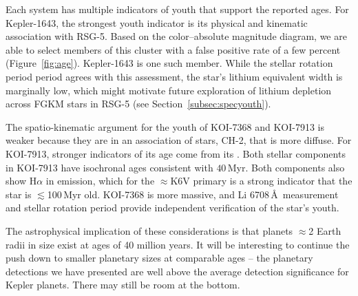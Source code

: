\documentclass[12pt,twocolumn,tighten,linenumbers,trackchanges]{aastex63}
\begin{document}
Each system has multiple indicators of youth that support the reported
ages.  For Kepler-1643, the strongest youth indicator is its physical
and kinematic association with RSG-5.  Based on the color--absolute
magnitude diagram, we are able to select members of this cluster with
a false positive rate of a few percent (Figure~\ref{fig:age}).
Kepler-1643 is one such member.  While the stellar rotation period
period agrees with this assessment, the star's lithium equivalent
width is marginally low, which might motivate future exploration of
lithium depletion across FGKM stars in RSG-5 (see
Section~\ref{subsec:specyouth}).

The spatio-kinematic argument for the youth of KOI-7368 and KOI-7913
is weaker because they are in an association of stars, CH-2, that is
more diffuse.  For KOI-7913, stronger indicators of its age come from
its .  Both stellar components in KOI-7913 have isochronal ages
consistent with $40$\,Myr.  Both components also show H$\alpha$ in
emission, which for the  $\approx$K6V primary is a strong indicator
that the star is $\lesssim$100$\,$Myr old.  KOI-7368 is  more
massive, and  Li 6708\,\AA\ measurement and stellar rotation period
provide independent verification of the star's youth.

The astrophysical implication of these considerations is that planets
$\approx$2 Earth radii in size exist at ages of 40 million years.  It
will be interesting to continue the push down to smaller planetary
sizes at comparable ages -- the planetary detections we have presented
are well above the average detection significance for Kepler planets.
There may still be room at the bottom.



\end{document}
